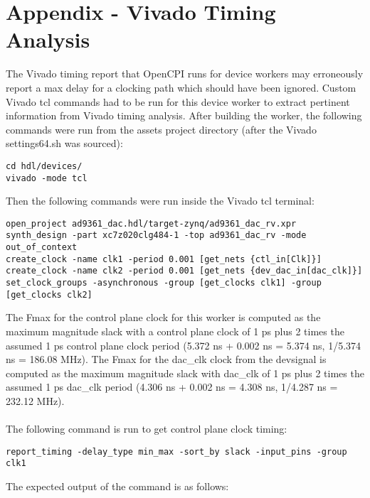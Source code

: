 \section{Appendix - Vivado Timing Analysis} \label{appendix}

The Vivado timing report that OpenCPI runs for device workers may erroneously report a max delay for a clocking path which should have been ignored. Custom Vivado tcl commands had to be run for this device worker to extract pertinent information from Vivado timing analysis. After building the worker, the following commands were run from the assets project directory (after the Vivado settings64.sh was sourced):
\begin{lstlisting}
cd hdl/devices/
vivado -mode tcl
\end{lstlisting}
Then the following commands were run inside the Vivado tcl terminal:
\begin{lstlisting}
open_project ad9361_dac.hdl/target-zynq/ad9361_dac_rv.xpr
synth_design -part xc7z020clg484-1 -top ad9361_dac_rv -mode out_of_context
create_clock -name clk1 -period 0.001 [get_nets {ctl_in[Clk]}]
create_clock -name clk2 -period 0.001 [get_nets {dev_dac_in[dac_clk]}]
set_clock_groups -asynchronous -group [get_clocks clk1] -group [get_clocks clk2]
\end{lstlisting}
The Fmax for the control plane clock for this worker is computed as the maximum magnitude slack with a control plane clock of 1 ps plus 2 times the assumed 1 ps control plane clock period (5.372 ns + 0.002 ns = 5.374 ns, 1/5.374 ns = 186.08 MHz). The Fmax for the dac\_clk clock from the devsignal is computed as the maximum magnitude slack with dac\_clk of 1 ps plus 2 times the assumed 1 ps dac\_clk period (4.306 ns + 0.002 ns = 4.308 ns, 1/4.287 ns = 232.12 MHz). \\ \\
The following command is run to get control plane clock timing:
\begin{lstlisting}
report_timing -delay_type min_max -sort_by slack -input_pins -group clk1
\end{lstlisting}
The expected output of the command is as follows:
\fontsize{6}{12}\selectfont
